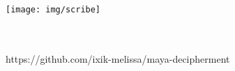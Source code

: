 \documentclass[../main.tex]{subfiles}
\begin{document}
\begin{titlepage}	
	\begin{center}
		\texttt{[image: img/scribe]}
		\\
		\Large{\textsf{\worktitle}}
		\\
		\Large{\textsf{\theauthor}}
		\vspace{2em}
		\\
	\end{center}
	\begin{flushright}
		https://github.com/ixik-melissa/maya-decipherment
		\\
		\documentversionlongcount \documentversiontzolkin \documentversionhaab
		\\
		\documentversiongregoriandate{}
	\end{flushright}
\end{titlepage}	

\clearpage 
\thispagestyle{empty}
\section*{}

\end{document}
